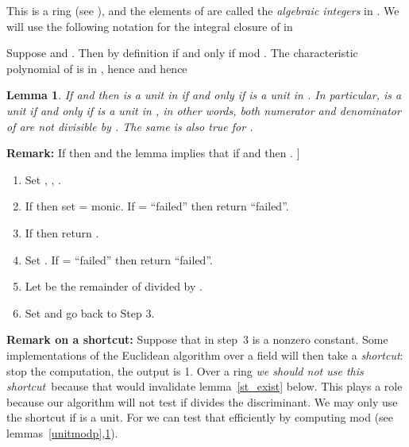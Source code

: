 \documentclass[10pt]{article}
\newtheorem{lemma}{Lemma}
\begin{document}
This is a ring (see \cite{Hecke}), and the elements of 
are called the {\em algebraic integers} in .
We will use the following notation for the integral closure of 
in 

Suppose  and .
Then by definition  if and only if  mod .
The characteristic polynomial of  is in , hence 
and hence


\begin{lemma}
\label{unit}
If  and  then  is a unit
in  if and only if  is a unit in .
In particular,  is a unit if and only if
 is a unit in , in other words,
both numerator and denominator
of  are not divisible by .
The same is also true for .
\end{lemma}
{\bf Remark:} If  then 
and the lemma implies that if  and
 then . \-15pt]
\begin{enumerate}
\item	Set , , .
\vspace*{-2mm}
\item	\label{monic1}
	If  then set  = monic.
	If  = ``failed'' then return ``failed''.\vspace*{-2mm}
\item	If  then return .
\vspace*{-2mm}
\item	\label{monic2}
	Set .
	If  = ``failed'' then return ``failed''. \vspace*{-2mm}
\item	Let  be the remainder of  divided by .
\vspace*{-2mm}
\item	\label{laststep} Set  and go back to Step 3.
\end{enumerate}
{\bf Remark on a shortcut:}
Suppose that  in step~3 is a nonzero constant.
Some implementations of the Euclidean algorithm over a field will then take a
{\em shortcut}: stop the computation, the output is 1.
Over a ring {\em we should not use this shortcut}\ because that would invalidate
lemma~\ref{st_exist} below. This plays a role because our algorithm will
not test if  divides the discriminant.
We may only use the shortcut if  is a unit.
For  we can test that efficiently
by computing  mod  (see lemmas~\ref{unitmodp},\ref{unit}).
\\
\end{document}
